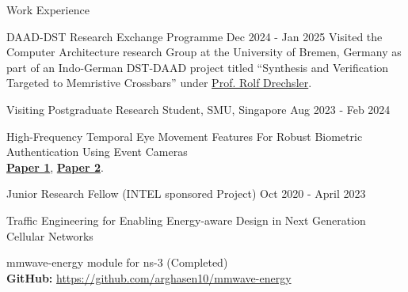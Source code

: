 \documentclass{resume} %
\begin{document}
	
	\begin{rSection}{Work Experience}
		
		\begin{rSubsection}{DAAD-DST Research Exchange Programme}
			{Dec 2024 - Jan 2025}{}{}
			Visited  the Computer Architecture  research Group at the University of Bremen, Germany as part of an Indo-German DST-DAAD project titled “Synthesis and Verification Targeted to Memristive Crossbars” under \href{https://www.rolfdrechsler.de/}{Prof. Rolf Drechsler}.
		\end{rSubsection}
		\begin{rSubsection}{Visiting Postgraduate Research Student, SMU, Singapore}  
			{Aug 2023 - Feb 2024}{}{}
			\item High-Frequency Temporal Eye Movement Features For Robust Biometric Authentication Using Event Cameras\\
			\href{https://dl.acm.org/doi/abs/10.1145/3699745}{\textbf{Paper 1}}, 
			\href{https://eye-tracking-for-physiological-sensing.github.io/eyegraph/}{\textbf{Paper 2}}.\\
		\end{rSubsection}
		
		
		\begin{rSubsection}{Junior Research Fellow (INTEL sponsored Project)}  
			{Oct 2020 - April 2023}{}{}
			\item Traffic Engineering for Enabling Energy-aware Design in Next Generation Cellular Networks
			\item mmwave-energy module for ns-3 (Completed)\\
			\textbf{GitHub:} \url{https://github.com/arghasen10/mmwave-energy}
		\end{rSubsection}
		

\end{rSection}
\end{document}

